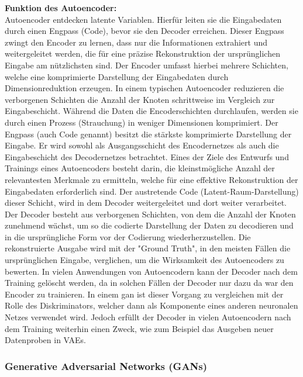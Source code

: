     \textbf{Funktion des Autoencoder:} \\
    Autoencoder entdecken latente Variablen. Hierfür leiten sie die Eingabedaten durch einen Engpass (Code), bevor sie den Decoder erreichen. Dieser Engpass zwingt den Encoder zu lernen, dass nur die Informationen extrahiert und weitergeleitet werden, die für eine präzise Rekonstruktion der ursprünglichen Eingabe am nützlichsten sind.\newline
    Der Encoder umfasst hierbei mehrere Schichten, welche eine komprimierte Darstellung der Eingabedaten durch Dimensionreduktion erzeugen. In einem typischen Autoencoder reduzieren die verborgenen Schichten die Anzahl der Knoten schrittweise im Vergleich zur Eingabeschicht. Während die Daten die Encoderschichten durchlaufen, werden sie durch einen Prozess (Strauchung) in weniger Dimensionen komprimiert.\newline
    Der Engpass (auch Code genannt) besitzt die stärkste komprimierte Darstellung der Eingabe. Er wird sowohl als Ausgangsschicht des Encodernetzes als auch die Eingabeschicht des Decodernetzes betrachtet. Eines der Ziele des Entwurfs und Trainings eines Autoencoders besteht darin, die kleinstmögliche Anzahl der relevantesten Merkmale zu ermitteln, welche für eine effektive Rekonstruktion der Eingabedaten erforderlich sind. Der austretende Code (Latent-Raum-Darstellung) dieser Schicht, wird in dem Decoder weitergeleitet und dort weiter verarbeitet.\newline
    Der Decoder besteht aus verborgenen Schichten, von dem die Anzahl der Knoten zunehmend wächst, um so die codierte Darstellung der Daten zu decodieren und in die ursprüngliche Form vor der Codierung wiederherzustellen. Die rekonstruierte Ausgabe wird mit der "Ground Truth", in den meisten Fällen die ursprünglichen Eingabe, verglichen, um die Wirksamkeit des Autoencoders zu bewerten.\newline
    In vielen Anwendungen von Autoencodern kann der Decoder nach dem Training gelöscht werden, da in solchen Fällen der Decoder nur dazu da war den Encoder zu trainieren. In einem \gls{gan} ist dieser Vorgang zu vergleichen mit der Rolle des Diskriminators, welcher dann als Komponente eines anderen neuronalen Netzes verwendet wird. Jedoch erfüllt der Decoder in vielen Autoencodern nach dem Training weiterhin einen Zweck, wie zum Beispiel das Ausgeben neuer Datenproben in \gls{VAE}s.\cite{ibmAutoencoder}

\subsubsection{Generative Adversarial Networks (GANs)}\label{subsubsec:gans}

